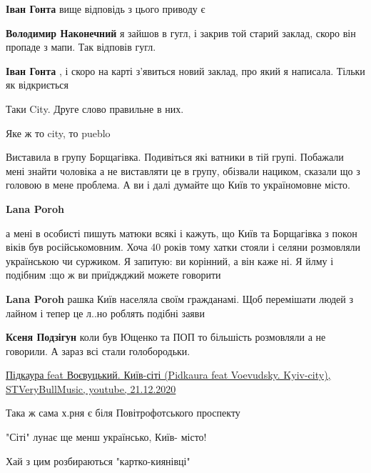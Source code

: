 \begin{itemize}
\begin{itemize} %
\textbf{Іван Гонта} вище відповідь з цього приводу є

\textbf{Володимир Наконечний} я зайшов в гугл, і закрив той старий заклад, скоро він пропаде з мапи. Так відповів гугл.

\begin{itemize} %
\textbf{Іван Гонта} , і скоро на карті з'явиться новий заклад, про який я написала. Тільки як відкриється
\end{itemize} %

\end{itemize} %

Таки City. Друге слово правильне в них.

Яке ж то city, то pueblo


Виставила в групу Борщагівка. Подивіться які ватники в тій групі. Побажали мені
знайти чоловіка а не виставляти це в групу, обізвали нациком, сказали що з
головою в мене проблема. А ви і далі думайте що Київ то україномовне місто.

\begin{itemize} %
\textbf{Lana Poroh} 

а мені в особисті пишуть матюки всякі і кажуть, що Київ та Борщагівка з покон
віків був російськомовним. Хоча 40 років тому хатки стояли і селяни розмовляли
українською чи суржиком. Я запитую: ви корінний, а він каже ні. Я йлму і
подібним :що ж ви приїджджий можете говорити

\textbf{Lana Poroh} рашка Київ населяла своїм гражданамі. Щоб перемішати людей з лайном і тепер це л..но роблять подібні заяви

\begin{itemize} %
\textbf{Ксеня Подзігун} коли був Ющенко та ПОП то більшість розмовляли а не говорили. А зараз всі стали голобородьки.
\end{itemize} %

\end{itemize} %


\href{https://youtu.be/8yn9b83qs4k}{%
Підкаура feat Воєвуцький. Київ-сіті (Pidkaura feat Voevudsky. Kyiv-city), STVeryBullMusic, youtube, 21.12.2020%
}

Така ж сама х.рня є біля Повітрофотського проспекту

"Сіті" лунає ще менш українсько, Київ- місто!

Хай з цим розбираються "картко-киянівці"

\end{itemize} %
